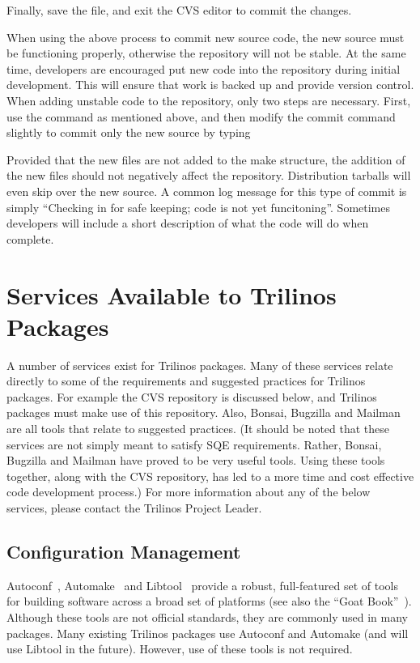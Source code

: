 \documentclass[12pt,relax]{TrilinosDevGuide}
\begin{document}
\begin{enumerate}
Finally, save the file, and exit the CVS editor to commit the changes.

When using the above process to commit new source code, the new source must 
be functioning properly, otherwise the repository will not be stable.  
At the same time, developers are encouraged put new code into the repository 
during initial development.  This will ensure that work is backed up and 
provide version control.  When adding unstable code to the repository, only
two steps are necessary.  First, use the  command as 
mentioned above, and then modify the commit command slightly to commit only 
the new source by typing


Provided that the new files are not added to the make structure, the addition 
of the new files should not negatively affect the repository.  Distribution 
tarballs will even skip over the new source.  A common log message for this 
type of commit is simply ``Checking in for safe keeping; code is not yet 
funcitoning''.  Sometimes developers will include a short description of what 
the code will do when complete.
\end{enumerate}

\section{Services Available to Trilinos Packages}
\label{Section:AvailableServices}
A number of services exist for Trilinos packages.  Many of these 
services relate directly to some of the requirements and suggested practices 
for Trilinos packages.  For example the CVS repository is discussed below, and 
Trilinos packages must make use of this repository.  Also, Bonsai, Bugzilla 
and Mailman are all tools that relate to suggested practices.  (It should be 
noted that these services are not simply meant to satisfy SQE requirements.  
Rather, Bonsai, Bugzilla and Mailman have proved to be very useful tools.  
Using these tools together, along with the CVS repository, has led to a more 
time and cost effective code development process.)  For more information about 
any of the below services, please contact the Trilinos Project Leader.

\subsection{Configuration Management}
Autoconf~\cite{Autoconf},  Automake~\cite{Automake} and Libtool~\cite{Libtool} 
provide a robust, full-featured set of tools for building software across a 
broad set of platforms (see also the ``Goat Book''~\cite{GoatBook}).  Although 
these tools are not official standards, they are commonly used in many 
packages.  Many existing Trilinos packages use Autoconf and Automake (and will 
use Libtool in the future).  However, use of these tools is not required.
\end{document}
